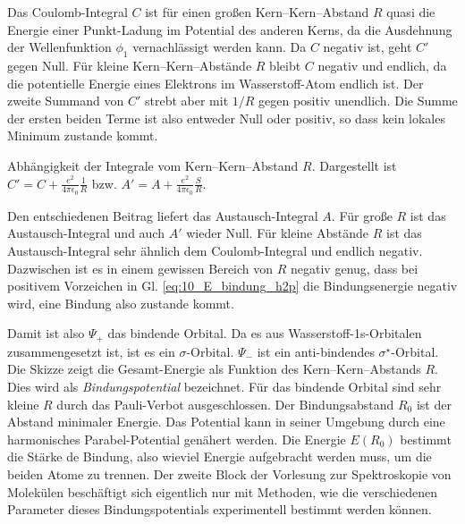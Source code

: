 Das Coulomb-Integral $C$ ist für einen  großen Kern--Kern--Abstand $R$ quasi die Energie einer Punkt-Ladung im Potential des anderen Kerns, da die Ausdehnung der Wellenfunktion $\phi_1$ vernachlässigt werden kann. Da $C$ negativ ist, geht $C'$ gegen Null. Für kleine Kern--Kern--Abstände $R$ bleibt $C$ negativ und endlich, da die potentielle Energie eines Elektrons im Wasserstoff-Atom endlich ist. Der zweite Summand von  $C'$ strebt aber mit $1/R$ gegen positiv unendlich. Die Summe der ersten beiden Terme ist also entweder Null oder positiv, so dass kein lokales Minimum zustande kommt.



\begin{marginfigure}

\caption{Abhängigkeit der Integrale vom Kern--Kern--Abstand $R$. Dargestellt ist 
$C' = C  + \frac{e^2}{4 \pi \epsilon_0} \frac{1 }{R}$ bzw. $A' = A   + \frac{e^2}{4 \pi \epsilon_0} \frac{ S }{R}$. \label{fig:10_H2_integrale_r}
 }
\end{marginfigure}



Den entschiedenen Beitrag liefert das Austausch-Integral $A$. Für große $R$ ist das Austausch-Integral und auch $A'$ wieder Null. Für kleine Abstände $R$ ist das Austausch-Integral sehr ähnlich dem Coulomb-Integral und endlich negativ. Dazwischen ist es in einem gewissen Bereich von $R$ negativ genug, dass bei positivem Vorzeichen in Gl. \ref{eq:10_E_bindung_h2p} die Bindungsenergie negativ wird, eine Bindung also zustande kommt.

Damit ist also $\Psi_+$ das bindende Orbital. Da es aus Wasserstoff-1s-Orbitalen zusammengesetzt ist, ist es ein $\sigma$-Orbital. $\Psi_-$ ist ein anti-bindendes $\sigma^\star$-Orbital. Die Skizze zeigt die Gesamt-Energie als Funktion des Kern--Kern--Abstands $R$. Dies wird als \emph{Bindungspotential} bezeichnet. Für das bindende Orbital sind sehr kleine $R$ durch das Pauli-Verbot ausgeschlossen.
Der Bindungsabstand $R_0$ ist der Abstand minimaler Energie. Das Potential kann in seiner Umgebung durch eine harmonisches Parabel-Potential genähert werden. Die Energie $E(R_0)$ bestimmt die Stärke de Bindung, also wieviel Energie aufgebracht werden muss, um die beiden Atome zu trennen. Der zweite Block der Vorlesung zur Spektroskopie von Molekülen beschäftigt sich eigentlich nur mit Methoden, wie die verschiedenen Parameter dieses Bindungspotentials experimentell bestimmt werden können.



